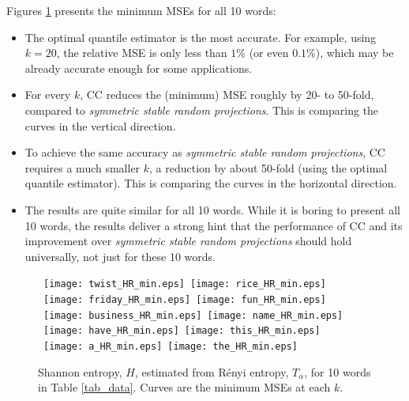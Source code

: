 \documentclass{sig-alternate}
\begin{document}
\clearpage

Figures \ref{fig_HR_min} presents the minimum MSEs for all 10 words:
\begin{itemize}
\item The optimal quantile estimator is the most accurate. For example, using $k = 20$, the relative MSE is only less than $1\%$ (or even $0.1\%$), which may be already accurate enough for some applications.
\item For every $k$, CC reduces the (minimum) MSE roughly by 20- to 50-fold, compared to {\em symmetric stable random projections}. This is comparing the curves in the vertical direction.
\item To achieve the same accuracy as {\em symmetric stable random projections}, CC requires a much smaller $k$, a reduction by about 50-fold (using the optimal quantile estimator). This is comparing the curves in the horizontal direction.
\item The results are quite similar for all 10 words. While it is boring to present all 10 words, the results deliver a strong hint that the performance of CC and its improvement over {\em symmetric stable random projections} should hold
    universally, not just for these 10 words.
\end{itemize}

\begin{figure}[h]
\begin{center}\mbox{
{\texttt{[image: twist\_HR\_min.eps]}} \hspace{-0.1in}
{\texttt{[image: rice\_HR\_min.eps]}}}
\mbox{
{\texttt{[image: friday\_HR\_min.eps]}} \hspace{-0.1in}
{\texttt{[image: fun\_HR\_min.eps]}}}
\mbox{
{\texttt{[image: business\_HR\_min.eps]}} \hspace{-0.1in}
{\texttt{[image: name\_HR\_min.eps]}}}
\mbox{
{\texttt{[image: have\_HR\_min.eps]}} \hspace{-0.1in}
{\texttt{[image: this\_HR\_min.eps]}}
}
\mbox{
{\texttt{[image: a\_HR\_min.eps]}} \hspace{-0.1in}
{\texttt{[image: the\_HR\_min.eps]}}
}
\end{center}
\vspace{-0.15in}
\caption{Shannon entropy, $H$, estimated from R\'enyi  entropy, $T_\alpha$, for 10 words in Table \ref{tab_data}. Curves are the minimum MSEs at each $k$.  }\label{fig_HR_min}
\end{figure}
\end{document}
